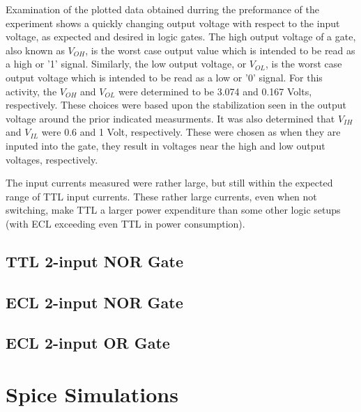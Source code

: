 \documentclass[10pt]{article}
\begin{document}
Examination of the plotted data obtained durring the preformance of the
experiment shows a quickly changing output voltage with respect to the
input voltage, as expected and desired in logic gates. The high output
voltage of a gate, also known as $V_{OH}$, is the worst case output value
which is intended to be read as a high or '1' signal. Similarly, the low
output voltage, or $V_{OL}$, is the worst case output voltage which is
intended to be read as a low or '0' signal. For this activity, the $V_{OH}$ and
$V_{OL}$ were determined to be 3.074 and 0.167 Volts, respectively. These
choices were based upon the stabilization seen in the output voltage
around the prior indicated measurments. It was also determined that
$V_{IH}$ and $V_{IL}$ were 0.6 and 1 Volt, respectively. These were chosen
as when they are inputed into the gate, they result in voltages near the
high and low output voltages, respectively.

The input currents measured were rather large, but still within the
expected range of TTL input currents. These rather large currents, even
when not switching, make TTL a larger power expenditure than some other
logic setups (with ECL exceeding even TTL in power consumption).

\subsection{TTL 2-input NOR Gate}



\subsection{ECL 2-input NOR Gate}



\subsection{ECL 2-input OR Gate}



\section{Spice Simulations}
%
\end{document}
